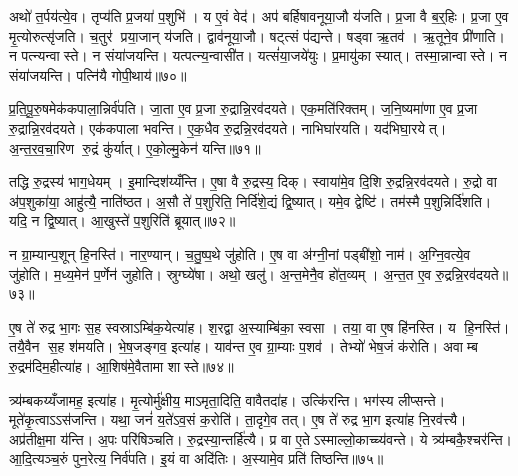 अथो॑ त॒र्पय॑त्ये॒व। तृप्य॑ति प्र॒जया॑ प॒शुभि॑। य ए॒वं वेद॑। अप॑ बर्\mbox{}हिषावनूया॒जौ य॑जति। प्र॒जा वै ब॒र्॒हिः। प्र॒जा ए॒व मृ॒त्योरुत्सृ॑जति। च॒तुर॑ प्रया॒जान् य॑जति। द्वाव॑नूया॒जौ। षट्त्सं प॑द्यन्ते। षड्वा ऋ॒तव॑। ऋ॒तूने॒व प्री॑णाति। न पत्न्यन्वास्ते। न संया॑जयन्ति। यत्पत्न्य॒न्वासी॑त। यत्सं॑या॒जये॑युः। प्र॒मायु॑का स्यात्। तस्मा॒न्नान्वास्ते। न संया॑जयन्ति। पत्नि॑यै गोपी॒थाय॑॥७०॥

प्र॒ति॒पू॒रु॒षमेक॑कपाला॒न्निर्व॑पति। जा॒ता ए॒व प्र॒जा रु॒द्रान्नि॒रव॑दयते। एक॒मति॑रिक्तम्। ज॒नि॒ष्यमा॑णा ए॒व प्र॒जा रु॒द्रान्नि॒रव॑दयते। एक॑कपाला भवन्ति। ए॒क॒धैव रु॒द्रन्नि॒रव॑दयते। नाभिघा॑रयति। यद॑भिघा॒रयेत्। अ॒न्त॒र॒व॒चा॒रिण रु॒द्रं कु॑र्यात्। ए॒को॒ल्मु॒केन॑ यन्ति॥७१॥

तद्धि रु॒द्रस्य॑ भाग॒धेयम्। इ॒मान्दिश॑य्यँन्ति। ए॒षा वै रु॒द्रस्य॒ दिक्। स्वाया॑मे॒व दि॒शि रु॒द्रन्नि॒रव॑दयते। रु॒द्रो वा अ॑प॒शुका॑या॒ आहु॑त्यै॒ नाति॑ष्ठत। अ॒सौ ते॑ प॒शुरिति॒ निर्दि॑शे॒द्यं द्वि॒ष्यात्। यमे॒व द्वेष्टि॑। तम॑स्मै प॒शुन्निर्दि॑शति। यदि॒ न द्वि॒ष्यात्। आ॒खुस्ते॑ प॒शुरिति॑ ब्रूयात्॥७२॥

न ग्रा॒म्यान्प॒शून् हि॒नस्ति॑। नार॒ण्यान्। च॒तु॒ष्प॒थे जु॑होति। ए॒ष वा अ॑ग्नी॒नां पड्बी॑शो॒ नाम॑। अ॒ग्नि॒वत्ये॒व जु॑होति। म॒ध्य॒मेन॑ प॒र्णेन॑ जुहोति। स्रुग्घ्ये॑षा। अथो॒ खलु॑। अ॒न्त॒मेनै॒व हो॑त॒व्यम्। अ॒न्त॒त ए॒व रु॒द्रन्नि॒रव॑दयते॥७३॥

ए॒ष ते॑ रुद्र भा॒गः स॒ह स्वस्राऽम्बि॑क॒येत्या॑ह। श॒रद्वा अ॒स्याम्बि॑का॒ स्वसा। तया॒ वा ए॒ष हि॑नस्ति। य हि॒नस्ति॑। तयै॒वैन स॒ह श॑मयति। भे॒ष॒जङ्गव॒ इत्या॑ह। याव॑न्त ए॒व ग्रा॒म्याः प॒शव॑। तेभ्यो॑ भेष॒जं क॑रोति। अवाम्ब रु॒द्रम॑दिम॒हीत्या॑ह। आ॒शिष॑मे॒वैतामा शास्ते॥७४॥

त्र्य॑म्बकय्यँजामह॒ इत्या॑ह। मृ॒त्योर्मु॑क्षीय॒ माऽमृता॒दिति॒ वावैतदा॑ह। उत्कि॑रन्ति। भग॑स्य लीप्सन्ते। मूते॑कृ॒त्वाऽऽस॑जन्ति। यथा॒ जनं॑ य॒ते॑ऽव॒सं क॒रोति॑। ता॒दृगे॒व तत्। ए॒ष ते॑ रुद्र भा॒ग इत्या॑ह नि॒रव॑त्त्यै। अप्र॑तीक्ष॒मा य॑न्ति। अ॒पः परि॑षिञ्चति। रु॒द्रस्या॒न्तर्\mbox{}हि॑त्यै। प्र वा ए॒तेऽस्माल्लो॒काच्च्य॑वन्ते। ये त्र्य॑म्बकै॒श्चर॑न्ति। आ॒दि॒त्यञ्च॒रुं पुन॒रेत्य॒ निर्व॑पति। इ॒यं वा अदि॑तिः। अ॒स्यामे॒व प्रति॑ तिष्ठन्ति॥७५॥


